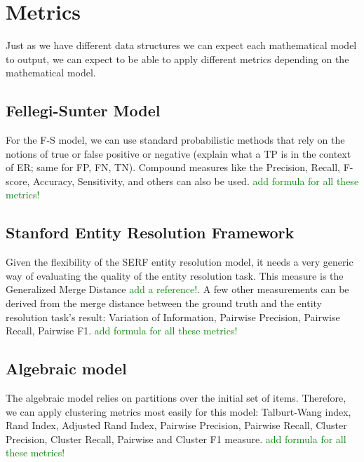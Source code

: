 \documentclass[11pt]{article}
\begin{document}
    \section{Metrics}\label{section:metrics}
    
    Just as we have different data structures we can expect each mathematical model to output, we can expect to be able
    to apply different metrics depending on the mathematical model.

    \subsection[fsm]{Fellegi-Sunter Model}\label{subsec:fellegi-sunter-model}
    
    For the F-S model, we can use standard probabilistic methods that rely on the notions of true or false positive or negative (explain what a TP is in the context of ER; same for FP, FN, TN). Compound measures like the Precision, Recall, F-score, Accuracy, Sensitivity, and others can also be used. 
    \textcolor{green}{add formula for all these metrics!}


    \subsection[serf]{Stanford Entity Resolution Framework}\label{subsec:stanford-entity-resolution-framework}
    
    Given the flexibility of the SERF entity resolution model, it needs a very generic way of evaluating the quality of the entity resolution task. This measure is the Generalized Merge Distance \textcolor{green}{add a reference!}. A few other measurements can be derived from the merge distance between the ground truth and the entity resolution task's result: Variation of Information, Pairwise Precision, Pairwise Recall, Pairwise F1. 
    \textcolor{green}{add formula for all these metrics!}

    \subsection[algebraic]{Algebraic model}\label{subsec:algebraic-model}

    The algebraic model relies on partitions over the initial set of items. Therefore, we can apply clustering metrics most easily for this model: Talburt-Wang index, Rand Index, Adjusted Rand Index, Pairwise Precision, Pairwise Recall, Cluster Precision, Cluster Recall, Pairwise and Cluster F1 measure.
    \textcolor{green}{add formula for all these metrics!}
\end{document}
